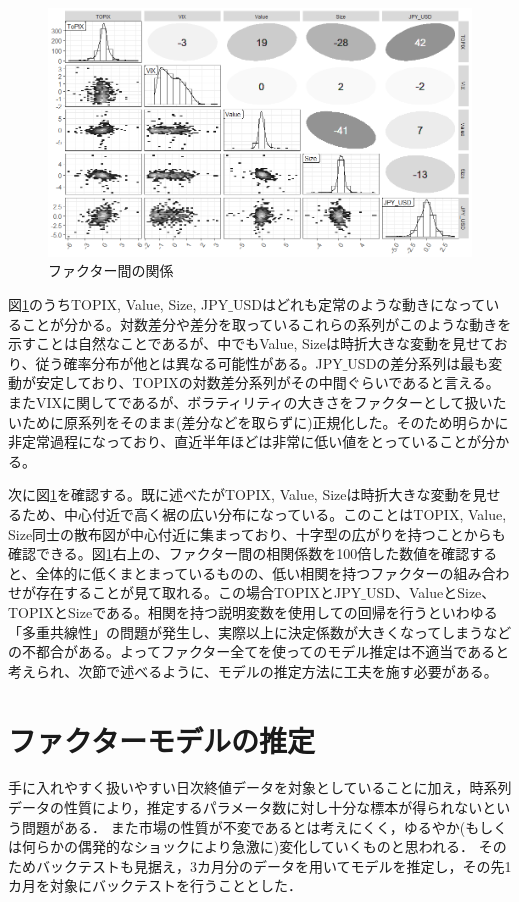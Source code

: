 \documentclass[11pt]{jreport}
\begin{document}
\begin{figure}[H]
	\begin{center}
		\includegraphics[width=15cm]{./fig/factor_cor.png}
		\caption{ファクター間の関係}
		\label{fig:factor_cor}
	\end{center}
\end{figure}

図\ref{fig:factor_cor}のうちTOPIX, Value, Size, JPY$\_$USDはどれも定常のような動きになっていることが分かる。対数差分や差分を取っているこれらの系列がこのような動きを示すことは自然なことであるが、中でもValue, Sizeは時折大きな変動を見せており、従う確率分布が他とは異なる可能性がある。JPY$\_$USDの差分系列は最も変動が安定しており、TOPIXの対数差分系列がその中間ぐらいであると言える。またVIXに関してであるが、ボラティリティの大きさをファクターとして扱いたいために原系列をそのまま(差分などを取らずに)正規化した。そのため明らかに非定常過程になっており、直近半年ほどは非常に低い値をとっていることが分かる。

次に図\ref{fig:factor_cor}を確認する。既に述べたがTOPIX, Value, Sizeは時折大きな変動を見せるため、中心付近で高く裾の広い分布になっている。このことはTOPIX, Value, Size同士の散布図が中心付近に集まっており、十字型の広がりを持つことからも確認できる。図\ref{fig:factor_cor}右上の、ファクター間の相関係数を100倍した数値を確認すると、全体的に低くまとまっているものの、低い相関を持つファクターの組み合わせが存在することが見て取れる。この場合TOPIXとJPY$\_$USD、ValueとSize、TOPIXとSizeである。相関を持つ説明変数を使用しての回帰を行うといわゆる「多重共線性」の問題が発生し、実際以上に決定係数が大きくなってしまうなどの不都合がある。よってファクター全てを使ってのモデル推定は不適当であると考えられ、次節で述べるように、モデルの推定方法に工夫を施す必要がある。

\section{ファクターモデルの推定}
手に入れやすく扱いやすい日次終値データを対象としていることに加え，時系列データの性質により，推定するパラメータ数に対し十分な標本が得られないという問題がある．
また市場の性質が不変であるとは考えにくく，ゆるやか(もしくは何らかの偶発的なショックにより急激に)変化していくものと思われる．
そのためバックテストも見据え，3カ月分のデータを用いてモデルを推定し，その先1カ月を対象にバックテストを行うこととした．
\end{document}
